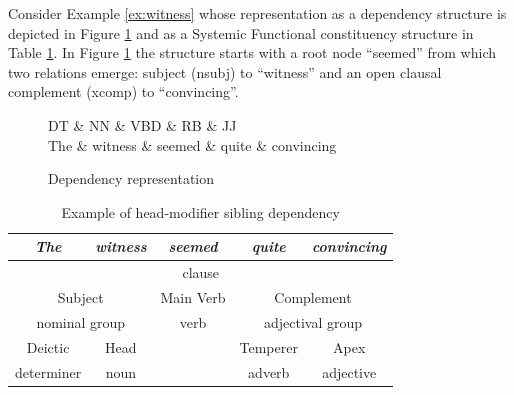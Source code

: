     Consider Example \ref{ex:witness} whose representation as a dependency structure is depicted in Figure \ref{fig:dependency-dg-ex} and as a Systemic Functional constituency structure in Table \ref{tab:dependency-sfg-ex}. In Figure \ref{fig:dependency-dg-ex} the structure starts with a root node ``seemed'' from which two relations emerge: subject (nsubj) to ``witness'' and an open clausal complement (xcomp) to ``convincing''.

    \begin{figure}[!ht]
        \centering
        \begin{dependency}
            \begin{deptext}[]
                DT \& NN \& VBD \& RB \& JJ\\ 
                The \& witness \& seemed \& quite \& convincing\\ 
            \end{deptext}
        \end{dependency}
        \caption{Dependency representation } %
        \label{fig:dependency-dg-ex}
    \end{figure}
    \begin{table}[!ht]
        \centering
        \begin{tabular}{|c|c|c|c|c|}
            \hline
            \textit{The}   & \textit{witness}   & \textit{seemed} & \textit{quite}  & \textit{convincing} \\ \hline
            \multicolumn{5}{|c|}{clause}                                                                  \\ \hline
            \multicolumn{2}{|c|}{Subject}       & Main Verb       & \multicolumn{2}{c|}{Complement}       \\ \hline
            \multicolumn{2}{|c|}{nominal group} & verb            & \multicolumn{2}{c|}{adjectival group} \\ \hline
            Deictic        & Head              &                 & Temperer        & Apex                \\ \cline{1-2} \cline{4-5} 
            determiner     & noun               &                 & adverb          & adjective           \\ \cline{1-2} \cline{4-5} 
        \end{tabular}
        \caption{Example of head-modifier sibling dependency}
        \label{tab:dependency-sfg-ex}
    \end{table}

